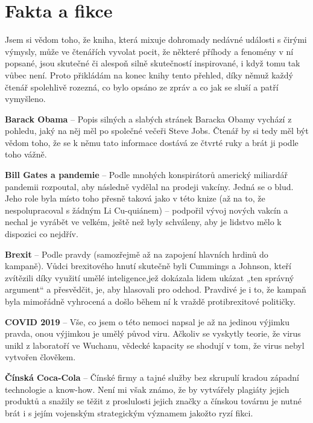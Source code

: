 \chapter*{Fakta a fikce}

Jsem si vědom toho, že kniha, která mixuje dohromady nedávné události s čirými výmysly, může ve čtenářích vyvolat pocit, že některé příhody a fenomény v ní popsané, jsou skutečné či alespoň silně skutečností inspirované, i když tomu tak vůbec není. Proto přikládám na konec knihy tento přehled, díky němuž každý čtenář spolehlivě rozezná, co bylo opsáno ze zpráv a co jak se sluší a patří vymyšleno.\vspace{0.5cm}

\textbf{Barack Obama} – Popis silných a slabých stránek Baracka Obamy vychází z pohledu, jaký na něj měl po společné večeři Steve Jobs. Čtenář by si tedy měl být vědom toho, že se k němu tato informace dostává ze čtvrté ruky a brát ji podle toho vážně.\vspace{0.5cm}

\textbf{Bill Gates a pandemie} – Podle mnohých konspirátorů americký miliardář pandemii rozpoutal, aby následně vydělal na prodeji vakcíny. Jedná se o blud. Jeho role byla místo toho přesně taková jako v této knize (až na to, že nespolupracoval s žádným Li Cu-quiánem) – podpořil vývoj nových vakcín a nechal je vyrábět ve velkém, ještě než byly schváleny, aby je lidstvo mělo k dispozici co nejdřív.\vspace{0.5cm}

\textbf{Brexit} – Podle pravdy (samozřejmě až na zapojení hlavních hrdinů do kampaně). Vůdci brexitového hnutí skutečně byli Cummings a Johnson, kteří zvítězili díky využití umělé inteligence,jež dokázala lidem ukázat „ten správný argument“ a přesvědčit, je, aby hlasovali pro odchod. Pravdivé je i to, že kampaň byla mimořádně vyhrocená a došlo během ní k vraždě protibrexitové političky.\vspace{0.5cm}

\textbf{COVID 2019} – Vše, co jsem o této nemoci napsal je až na jedinou výjimku pravda, onou výjimkou je umělý původ viru. Ačkoliv se vyskytly teorie, že virus unikl z laboratoří ve Wuchanu, vědecké kapacity se shodují v tom, že virus nebyl vytvořen člověkem.\vspace{0.5cm}

\textbf{Čínská Coca-Cola} – Čínské firmy a tajné služby bez skrupulí kradou západní technologie a know-how. Není mi však známo, že by vytvářely plagiáty jejich produktů a snažily se těžit z proslulosti jejich značky a čínskou továrnu je nutné brát i s jejím vojenským strategickým významem jakožto ryzí fikci.\vspace{0.5cm}

